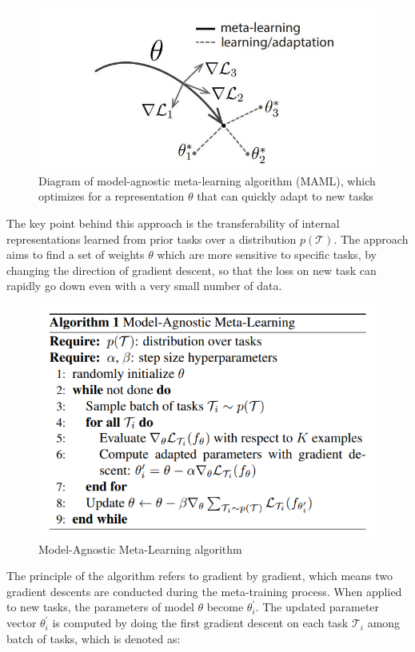 \begin{figure}[H]
	\includegraphics[scale=0.6]{MAML_01.JPG}
	\centering
	\caption{Diagram of model-agnostic meta-learning algorithm (MAML), which optimizes for a representation $\theta$ that can
    quickly adapt to new tasks}
	\label{MAML}
\end{figure}

The key point behind this approach is the transferability of internal representations learned from prior tasks over a distribution $p(\mathcal{T})$. The approach aims to find a set of weights $\theta$ which are more sensitive to specific tasks, by changing the direction of gradient descent, so that the loss on new task can rapidly go down even with a very small number of data.  

\begin{figure}[H]
	\includegraphics[scale=0.65]{MAML_02.PNG}
	\centering
	\caption{Model-Agnostic Meta-Learning algorithm}
	\label{MAML}
\end{figure}

The principle of the algorithm refers to gradient by gradient, which means two gradient descents are conducted during the meta-training process. When applied to new tasks, the parameters of model $\theta$ become $\theta_{i}^{\prime}$. The updated parameter vector $\theta_{i}^{\prime}$ is computed by doing the first gradient descent on each task $\mathcal{T}_{i}$ among batch of tasks, which is denoted as:

